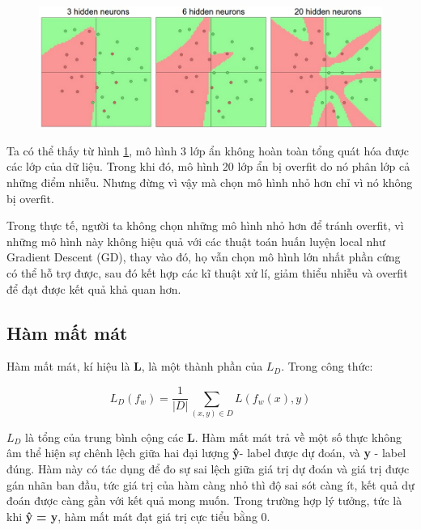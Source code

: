 \begin{center}
    \begin{figure}[H]
    \centering
    \includegraphics[width=1\columnwidth]{images/chap2/layer_sizes.jpeg}
    \label{chap2:three_net}
    \end{figure}
\end{center}

Ta có thể thấy từ hình \ref{chap2:three_net}, mô hình 3 lớp ẩn không hoàn toàn tổng quát hóa được các lớp của dữ liệu. Trong khi đó, mô hình 20 lớp ẩn bị overfit do nó phân lớp cả những điểm nhiễu. Nhưng đừng vì vậy mà chọn mô hình nhỏ hơn chỉ vì nó không bị overfit.

Trong thực tế, người ta không chọn những mô hình nhỏ hơn để tránh overfit, vì những mô hình này không hiệu quả với các thuật toán huấn luyện local như Gradient Descent (GD), thay vào đó, họ vẫn chọn mô hình lớn nhất phần cứng có thể hỗ trợ được, sau đó kết hợp các kĩ thuật xử lí, giảm thiểu nhiễu và overfit để đạt được kết quả khả quan hơn.

\subsection{Hàm mất mát}
Hàm mất mát, kí hiệu là \textbf{L}, là một thành phần của \textbf{\(L_D\)}. Trong công thức:
\begin{center}
	\begin{equation}
		L_D(f_w) = \frac{1}{\lvert D \rvert}\sum_{(x, y)\in D}L(f_w(x), y)
	\end{equation}
\end{center}
\textbf{\(L_D\)} là tổng của trung bình cộng các \textbf{L}. Hàm mất mát trả về một số thực không âm thể hiện sự chênh lệch giữa hai đại lượng \textbf{\^{y}}- label được dự đoán, và \textbf{y} - label đúng. Hàm này có tác dụng để đo sự sai lệch giữa giá trị dự đoán và giá trị được gán nhãn ban đầu, tức giá trị của hàm càng nhỏ thì độ sai sót càng ít, kết quả dự đoán được càng gần với kết quả mong muốn. Trong trường hợp lý tưởng, tức là khi \textbf{\^{y}} \textbf{ = y}, hàm mất mát đạt giá trị cực tiểu bằng 0.

